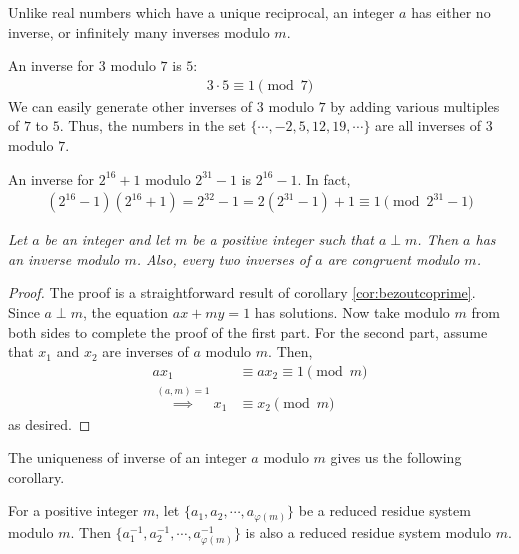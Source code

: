 \documentclass{subfile}
\begin{document}
	\begin{note}
		Unlike real numbers which have a unique reciprocal, an integer $a$ has either no inverse, or infinitely many inverses modulo $m$.
	\end{note}

	\begin{example}
		An inverse for $3$ modulo $7$ is $5$:
			\begin{align*}
				3 \cdot 5 \equiv 1 \pmod 7
			\end{align*}
		We can easily generate other inverses of $3$ modulo $7$ by adding various multiples of $7$ to $5$. Thus, the numbers in the set $\{\cdots, -2, 5, 12, 19, \cdots \}$ are all inverses of $3$ modulo $7$.
	\end{example}

	\begin{example}
		An inverse for $2^{16}+1$ modulo $2^{31}-1$ is $2^{16}-1$. In fact,
			\begin{align*}
				(2^{16} - 1)(2^{16} + 1) = 2^{32} -1 = 2(2^{31} - 1) + 1 \equiv 1 \pmod{2^{31} - 1}
			\end{align*}
	\end{example}


	\begin{theorem} \label{thm:arithinverse} \slshape
		Let $a$ be an integer and let $m$ be a positive integer such that $a \perp m$. Then $a$ has an inverse modulo $m$. Also, every two inverses of $a$ are congruent modulo $m$.
	\end{theorem}

	\begin{proof}
		The proof is a straightforward result of corollary \eqref{cor:bezoutcoprime}. Since $a \perp m$, the equation $ax+my=1$ has solutions. Now take modulo $m$ from both sides to complete the proof of the first part. For the second part, assume that $x_1$ and $x_2$ are inverses of $a$ modulo $m$. Then,
		\begin{align*}
		ax_1
			& \equiv ax_2 \equiv 1 \pmod m\\
		\stackrel{(a,m)=1}{\implies} x_1
			& \equiv x_2 \pmod m
		\end{align*}
		as desired.
	\end{proof}

The uniqueness of inverse of an integer $a$ modulo $m$ gives us the following corollary.

	\begin{corollary}
		For a positive integer $m$, let $\{a_{1}, a_{2}, \cdots, a_{\varphi(m)}\}$ be a reduced residue system modulo $m$. Then $\{a_{1}^{-1}, a_{2}^{-1}, \cdots, a_{\varphi(m)}^{-1}\}$ is also a reduced residue system modulo $m$.
	\end{corollary}
\end{document}
